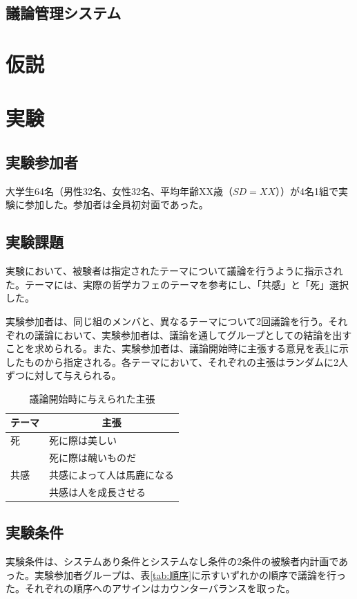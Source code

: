 \documentclass[11pt, a4paper]{jreport} %
\begin{document}
\subsection{議論管理システム}

\section{仮説}

\section{実験}
\subsection{実験参加者}
大学生64名（男性32名、女性32名、平均年齢XX歳（$SD=XX$））が4名1組で実験に参加した。参加者は全員初対面であった。
\subsection{実験課題}
実験において、被験者は指定されたテーマについて議論を行うように指示された。テーマには、実際の哲学カフェのテーマを参考にし、「共感」と「死」選択した。


実験参加者は、同じ組のメンバと、異なるテーマについて2回議論を行う。それぞれの議論において、実験参加者は、議論を通してグループとしての結論を出すことを求められる。また、実験参加者は、議論開始時に主張する意見を表\ref{tab:始めの意見}に示したものから指定される。各テーマにおいて、それぞれの主張はランダムに2人ずつに対して与えられる。

\begin{table}[]
\caption{議論開始時に与えられた主張}
\centering
\begin{tabular}{@{}ll@{}}
\toprule
テーマ & \multicolumn{1}{c}{主張} \\ \midrule
死    & 死に際は美しい                \\
     & 死に際は醜いものだ              \\
共感   & 共感によって人は馬鹿になる          \\
     & 共感は人を成長させる             \\ \bottomrule
\end{tabular}
\label{tab:始めの意見}
\end{table}




\subsection{実験条件}
実験条件は、システムあり条件とシステムなし条件の2条件の被験者内計画であった。実験参加者グループは、表\ref{tab:順序}に示すいずれかの順序で議論を行った。それぞれの順序へのアサインはカウンターバランスを取った。
\end{document}
